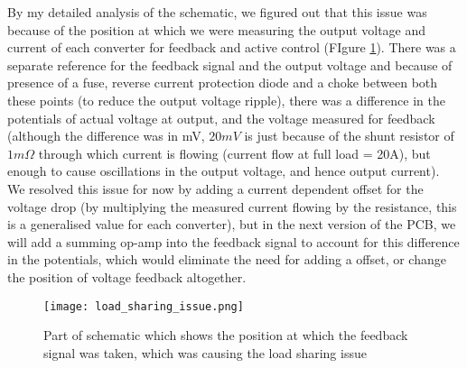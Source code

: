 \begin{itemize}
    By my detailed analysis of the schematic, we figured out that this issue was because of the position at which we were measuring the output voltage and current of each converter for feedback and active control (FIgure \ref*{fig:load_sharing}). There was a separate reference for the feedback signal and the output voltage and because of presence of a fuse, reverse current protection diode and a choke between both these points (to reduce the output voltage ripple), there was a difference in the potentials of actual voltage at output, and the voltage measured for feedback (although the difference was in mV, $20mV$ is just because of the shunt resistor of $1m\Omega$ through which current is flowing (current flow at full load = 20A), but enough to cause oscillations in the output voltage, and hence output current).\\
    We resolved this issue for now by adding a current dependent offset for the voltage drop (by multiplying the measured current flowing by the resistance, this is a generalised value for each converter), but in the next version of the PCB, we will add a summing op-amp into the feedback signal to account for this difference in the potentials, which would eliminate the need for adding a offset, or change the position of voltage feedback altogether.
    \begin{figure}[H]
        \centering
        \texttt{[image: load\_sharing\_issue.png]}
        \caption{Part of schematic which shows the position at which the feedback signal was taken, which was causing the load sharing issue}
        \label{fig:load_sharing}
    \end{figure}
\end{itemize}